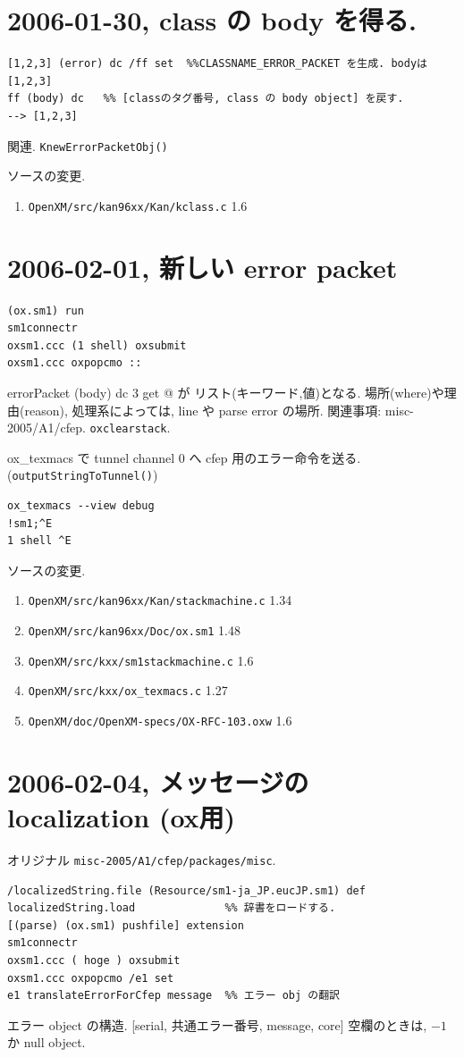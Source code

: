 \documentclass{jarticle}
\begin{document}
\section{2006-01-30, class の body を得る.}
\begin{verbatim}
[1,2,3] (error) dc /ff set  %%CLASSNAME_ERROR_PACKET を生成. bodyは[1,2,3]
ff (body) dc   %% [classのタグ番号, class の body object] を戻す.
--> [1,2,3]
\end{verbatim}
関連. {\tt KnewErrorPacketObj()}

ソースの変更.
\begin{enumerate}
\item {\tt OpenXM/src/kan96xx/Kan/kclass.c} 1.6
\end{enumerate}

\section{2006-02-01, 新しい error packet}
\begin{verbatim}
(ox.sm1) run
sm1connectr
oxsm1.ccc (1 shell) oxsubmit
oxsm1.ccc oxpopcmo ::
\end{verbatim}
\verb@ errorPacket (body) dc 3 get  @ が
リスト(キーワード,値)となる. 場所(where)や理由(reason),
処理系によっては, line や parse error の場所.
関連事項: misc-2005/A1/cfep.
{\tt oxclearstack}. 

ox\_texmacs で tunnel channel 0 へ cfep 用のエラー命令を送る.
({\tt outputStringToTunnel()})
\begin{verbatim}
ox_texmacs --view debug
!sm1;^E
1 shell ^E
\end{verbatim}


ソースの変更.
\begin{enumerate}
\item {\tt OpenXM/src/kan96xx/Kan/stackmachine.c} 1.34
\item {\tt OpenXM/src/kan96xx/Doc/ox.sm1}  1.48
\item {\tt OpenXM/src/kxx/sm1stackmachine.c}   1.6
\item {\tt OpenXM/src/kxx/ox\_texmacs.c}   1.27
\item {\tt OpenXM/doc/OpenXM-specs/OX-RFC-103.oxw} 1.6
\end{enumerate}

\section{2006-02-04, メッセージの localization (ox用)}
オリジナル {\tt misc-2005/A1/cfep/packages/misc}.
\begin{verbatim}
/localizedString.file (Resource/sm1-ja_JP.eucJP.sm1) def
localizedString.load              %% 辞書をロードする.
[(parse) (ox.sm1) pushfile] extension
sm1connectr 
oxsm1.ccc ( hoge ) oxsubmit 
oxsm1.ccc oxpopcmo /e1 set
e1 translateErrorForCfep message  %% エラー obj の翻訳
\end{verbatim}
エラー object の構造.
[serial, 共通エラー番号, message, core]
空欄のときは, $-1$ か null object.
\end{document}
